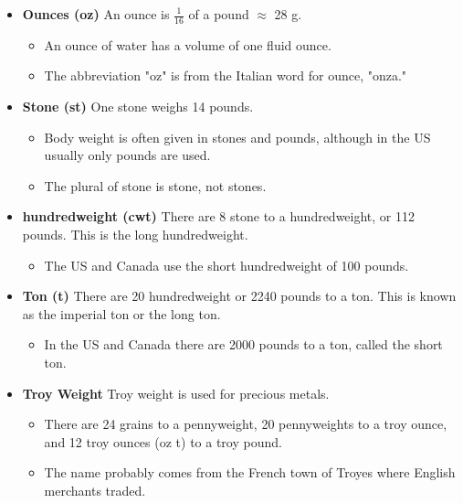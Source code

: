 \documentclass{article}
\begin{document}
\begin{itemize}
\item \textbf{Ounces (oz)} An ounce is $\frac{1}{16}$ of a pound $\approx$ 28 g.
  \begin{itemize}
  \item An ounce of water has a volume of one fluid ounce.
  \item The abbreviation "oz" is from the Italian word for ounce, "onza."
  \end{itemize}
\end{itemize}

\begin{itemize}
\item \textbf{Stone (st)} One stone weighs 14 pounds.
  \begin{itemize}
  \item Body weight is often given in stones and pounds, although in the US usually only pounds are used.
  \item The plural of stone is stone, not stones.
  \end{itemize}
\end{itemize}

\begin{itemize}
\item \textbf{hundredweight (cwt)} There are 8 stone to a hundredweight, or 112 pounds. This is the long hundredweight.
  \begin{itemize}
  \item The US and Canada use the short hundredweight of 100 pounds.
  \end{itemize}
\end{itemize}

\begin{itemize}
\item \textbf{Ton (t)} There are 20 hundredweight or 2240 pounds to a ton. This is known as the imperial ton or the long ton.
  \begin{itemize}
  \item In the US and Canada there are 2000 pounds to a ton, called the short ton.
  \end{itemize}
\end{itemize}

\begin{itemize}
\item \textbf{Troy Weight}
Troy weight is used for precious metals.
  \begin{itemize}
  \item There are 24 grains to a pennyweight, 20 pennyweights to a troy ounce, and 12 troy ounces (oz t) to a troy pound.
  \item The name probably comes from the French town of Troyes where English merchants traded.
  \end{itemize}
\end{itemize}
\end{document}
